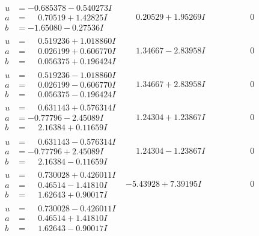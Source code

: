\documentclass[1p]{elsarticle_modified}
\theoremstyle{definition}
\begin{document}
$$\begin{array}{c|c|c}
\begin{aligned}
u &= -0.685378 - 0.540273 I \\
a &= \phantom{-}0.70519 + 1.42825 I \\
b &= -1.65080 - 0.27536 I\end{aligned}
 & \phantom{-}0.20529 + 1.95269 I & \phantom{-0.000000 } 0 \\ \hline\begin{aligned}
u &= \phantom{-}0.519236 + 1.018860 I \\
a &= \phantom{-}0.026199 + 0.606770 I \\
b &= \phantom{-}0.056375 + 0.196424 I\end{aligned}
 & \phantom{-}1.34667 - 2.83958 I & \phantom{-0.000000 } 0 \\ \hline\begin{aligned}
u &= \phantom{-}0.519236 - 1.018860 I \\
a &= \phantom{-}0.026199 - 0.606770 I \\
b &= \phantom{-}0.056375 - 0.196424 I\end{aligned}
 & \phantom{-}1.34667 + 2.83958 I & \phantom{-0.000000 } 0 \\ \hline\begin{aligned}
u &= \phantom{-}0.631143 + 0.576314 I \\
a &= -0.77796 - 2.45089 I \\
b &= \phantom{-}2.16384 + 0.11659 I\end{aligned}
 & \phantom{-}1.24304 + 1.23867 I & \phantom{-0.000000 } 0 \\ \hline\begin{aligned}
u &= \phantom{-}0.631143 - 0.576314 I \\
a &= -0.77796 + 2.45089 I \\
b &= \phantom{-}2.16384 - 0.11659 I\end{aligned}
 & \phantom{-}1.24304 - 1.23867 I & \phantom{-0.000000 } 0 \\ \hline\begin{aligned}
u &= \phantom{-}0.730028 + 0.426011 I \\
a &= \phantom{-}0.46514 - 1.41810 I \\
b &= \phantom{-}1.62643 + 0.90017 I\end{aligned}
 & -5.43928 + 7.39195 I & \phantom{-0.000000 } 0 \\ \hline\begin{aligned}
u &= \phantom{-}0.730028 - 0.426011 I \\
a &= \phantom{-}0.46514 + 1.41810 I \\
b &= \phantom{-}1.62643 - 0.90017 I\end{aligned}

\end{array}$$
\end{document}
